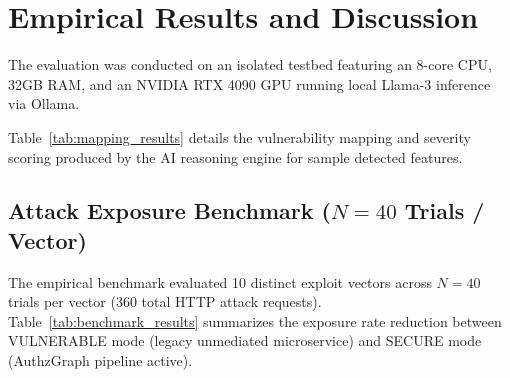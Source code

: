 \documentclass[journal]{IEEEtran}
\begin{document}
\section{Empirical Results and Discussion}

The evaluation was conducted on an isolated testbed featuring an 8-core CPU, 32GB RAM, and an NVIDIA RTX 4090 GPU running local Llama-3 inference via Ollama.

Table~\ref{tab:mapping_results} details the vulnerability mapping and severity scoring produced by the AI reasoning engine for sample detected features.

\begin{table}[!t]
\centering
\caption{Vulnerability Taxonomy Mapping and Risk Assessment Results}
\label{tab:mapping_results}
\end{table}

\subsection{Attack Exposure Benchmark ($N=40$ Trials / Vector)}
The empirical benchmark evaluated 10 distinct exploit vectors across $N=40$ trials per vector (360 total HTTP attack requests). Table~\ref{tab:benchmark_results} summarizes the exposure rate reduction between VULNERABLE mode (legacy unmediated microservice) and SECURE mode (AuthzGraph pipeline active).
\end{document}
